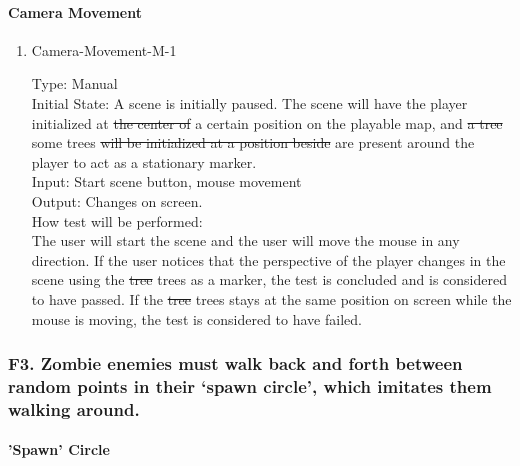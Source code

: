 \documentclass[12pt, titlepage]{article}
\DeclareRobustCommand{\hsout}[1]{\texorpdfstring{\sout{#1}}{#1}}
\newcounter{ftnum}
\begin{document}
\paragraph{Camera Movement}

\begin{enumerate}

\item{Camera-Movement-M-1\\}  \label{F2-1}

Type: Manual\\
					
Initial State: A scene is initially paused. The scene will have the player initialized at \hsout{the center of} {\color{magenta} a certain position on }the playable map, and \hsout{a tree} {\color{magenta} some trees } \hsout{will be initialized at a position beside} {\color{magenta} are present around} the player to act as a stationary marker.\\
					
Input: Start scene button, mouse movement \\
					
Output: Changes on screen. \\
					
How test will be performed:\\ The user will start the scene and the user will move the mouse in any direction. If the user notices that the perspective of the player changes in the scene using the \hsout{tree} {\color{magenta}trees} as a marker, the test is concluded and is considered to have passed. If the \hsout{tree} {\color{magenta}trees} stays at the same position on screen while the mouse is moving, the test is considered to have failed. \\

\end{enumerate}

\subsubsection{{\color{magenta} F3.} Zombie enemies must walk back and forth between random points in their ‘spawn circle’, which imitates them walking around.} 
		
\paragraph{'Spawn' Circle}
\end{document}
